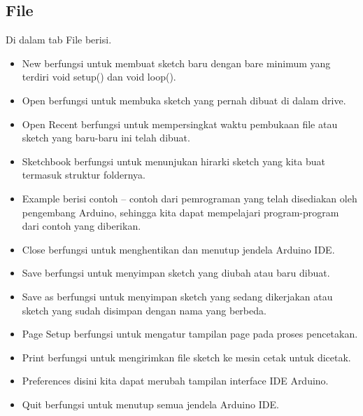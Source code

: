 \subsection{File}
Di dalam tab File berisi.
\begin{itemize}
\item New berfungsi untuk membuat sketch baru dengan bare minimum yang terdiri void setup() dan void loop(). 
\item Open berfungsi untuk membuka sketch yang pernah dibuat di dalam drive.
\item Open Recent berfungsi untuk mempersingkat waktu pembukaan file atau sketch yang baru-baru ini telah dibuat.
\item Sketchbook berfungsi untuk menunjukan hirarki sketch yang kita buat termasuk struktur foldernya.
\item Example berisi contoh – contoh dari pemrograman yang telah disediakan oleh pengembang Arduino, sehingga kita dapat mempelajari program-program dari contoh yang diberikan.
\item Close berfungsi untuk menghentikan dan menutup jendela Arduino IDE.
\item Save berfungsi untuk menyimpan sketch yang diubah atau baru dibuat.
\item Save as berfungsi untuk menyimpan sketch yang sedang dikerjakan atau sketch yang sudah disimpan dengan nama yang berbeda.
\item Page Setup berfungsi untuk mengatur tampilan page pada proses pencetakan.
\item Print berfungsi untuk mengirimkan file sketch ke mesin cetak untuk dicetak.
\item Preferences disini kita dapat merubah tampilan interface IDE Arduino.
\item Quit berfungsi untuk menutup semua jendela Arduino IDE.
\end{itemize}

